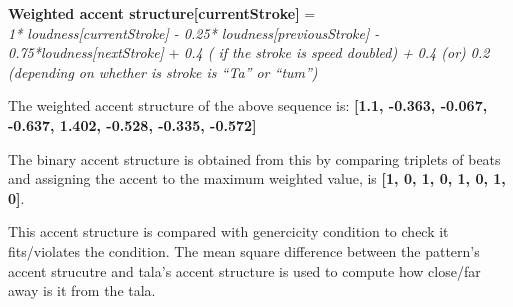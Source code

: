 \textbf{Weighted accent structure[currentStroke]} = \\

 \emph{1* loudness[currentStroke] - 0.25* loudness[previousStroke] - 0.75*loudness[nextStroke]} + 
\emph{0.4 ( if the stroke is speed doubled) +} 
\emph{0.4 (or) 0.2 (depending on whether is stroke is ``Ta'' or ``tum'') }

The weighted accent structure of the above sequence is:  \textbf{[1.1, -0.363, -0.067, -0.637, 1.402, -0.528, -0.335, -0.572]}
 

The binary accent structure is obtained from this by comparing triplets of beats and assigning the accent to the maximum weighted value, is \textbf{[1, 0, 1, 0, 1, 0, 1, 0]}.

This accent structure is compared with genercicity condition to check it fits/violates the condition. The mean square difference between the pattern's accent strucutre and tala's accent structure is used to compute how close/far away is it from the tala.


